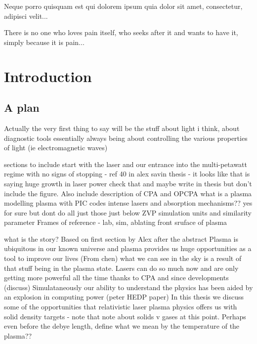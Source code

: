 \begin{savequote}[8cm]
\textlatin{Neque porro quisquam est qui dolorem ipsum quia dolor sit amet, consectetur, adipisci velit...}

There is no one who loves pain itself, who seeks after it and wants to have it, simply because it is pain...
\end{savequote}

\chapter{\label{ch:1-intro}Introduction} 

\minitoc

\section{A plan}
Actually the very first thing to say will be the stuff about light i think, about diagnostic tools essentially always being about controlling the various properties of light (ie electromagnetic waves)

sections to include
start with the laser and our entrance into the multi-petawatt regime with no signs of stopping - ref 40 in alex savin thesis - it looks like that is saying huge growth in laser power check that and maybe write in thesis but don't include the figure. Also include description of CPA and OPCPA
what is a plasma
modelling plasma with PIC codes
intense lasers and absorption mechanisms?? yes for sure but dont do all just those just below ZVP
simulation units and similarity parameter
Frames of reference - lab, sim, ablating front sruface of plasma

what is the story? Based on first section by Alex after the abstract
Plasma is ubiquitous in our known universe and plasma provides us huge opportunities as a tool to improve our lives
(From chen) what we can see in the sky is a result of that stuff being in the plasma state.
Lasers can do so much now and are only getting more powerful all the time thanks to CPA and since developments (discuss)
Simulataneously our ability to understand the physics has been aided by an explosion in computing power (peter HEDP paper)
In this thesis we discuss some of the opportunities that relativistic laser plasma physics offers us with solid density targets - note that note about solids v gases at this point. 
Perhaps even before the debye length, define what we mean by the temperature of the plasma??

